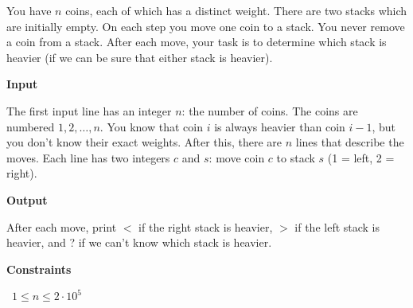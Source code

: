 You have $n$ coins, each of which has a distinct weight.
There are two stacks which are initially empty. On each step you move one coin to a stack. You never remove a coin from a stack.
After each move, your task is to determine which stack is heavier (if we can be sure that either stack is heavier).

\vspace{0.3cm}\noindent\textbf{Input}

The first input line has an integer $n$: the number of coins. The coins are numbered $1,2,\dots,n$. You know that coin $i$ is always heavier than coin $i-1$, but you don't know their exact weights.
After this, there are $n$ lines that describe the moves. Each line has two integers $c$ and $s$: move coin $c$ to stack $s$ (1 = left, 2 = right).

\vspace{0.3cm}\noindent\textbf{Output}

After each move, print $<$ if the right stack is heavier, $>$ if the left stack is heavier, and ? if we can't know which stack is heavier.

\vspace{0.3cm}\noindent\textbf{Constraints}

\textbullet\ $1 \le n \le 2 \cdot 10^5$